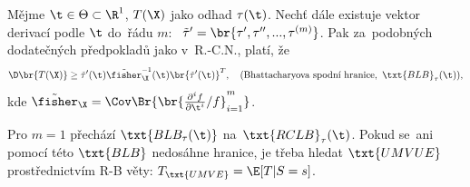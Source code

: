\begin{theorem}[Bhattacharya]
	Mějme $\t\in\Theta\subset\R^1$, $T(\X)$ jako odhad $\tau(\t)$. Nechť dále existuje vektor derivací podle $\t$ do~řádu $m$:~ $\tilde{\tau}'=\br{\tau',\tau'',...,\tau^{(m)}}$. Pak za~podobných dodatečných předpokladů jako v~R.-C.N., platí, že$$\D\br{T(\X)}\geq \tilde{\tau}'(\t)\tilde{\fisher}_\X^{-1}(\t)\br{\tilde{\tau}'(\t)}^T,\quad (\text{Bhattacharyova spodní hranice},~\txt{BLB}_\tau(\t)),$$ kde $\tilde{\fisher}_\X=\Cov\Br{\br{\frac{\partial^i f}{\partial\t^i}/f}_{i=1}^m}$.
\end{theorem}
\begin{remark}
	Pro $m=1$ přechází $\txt{BLB_\tau(\t)}$ na~$\txt{RCLB}_\tau(\t)$. 
	Pokud se~ani pomocí této $\txt{BLB}$ nedosáhne hranice, je třeba hledat $\txt{UMVUE}$ prostřednictvím R-B věty: $T_\txt{UMVE}=\E[T|S=s]$.
\end{remark}

